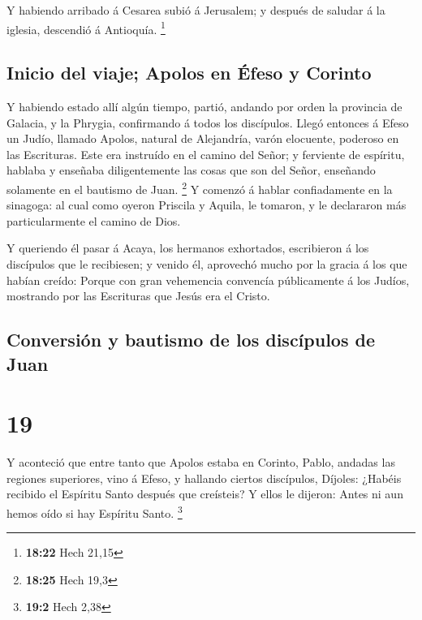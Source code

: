  Y habiendo arribado á Cesarea subió á Jerusalem; y
después de saludar á la iglesia, descendió á Antioquía. \footnote{\textbf{18:22}
  Hech 21,15}

\hypertarget{inicio-del-viaje-apolos-en-uxe9feso-y-corinto}{%
\subsection{Inicio del viaje; Apolos en Éfeso y
Corinto}\label{inicio-del-viaje-apolos-en-uxe9feso-y-corinto}}

 Y habiendo estado allí algún tiempo, partió, andando por
orden la provincia de Galacia, y la Phrygia, confirmando á todos los
discípulos.  Llegó entonces á Efeso un Judío, llamado
Apolos, natural de Alejandría, varón elocuente, poderoso en las
Escrituras.  Este era instruído en el camino del Señor; y
ferviente de espíritu, hablaba y enseñaba diligentemente las cosas que
son del Señor, enseñando solamente en el bautismo de Juan. \footnote{\textbf{18:25}
  Hech 19,3}  Y comenzó á hablar confiadamente en la
sinagoga: al cual como oyeron Priscila y Aquila, le tomaron, y le
declararon más particularmente el camino de Dios.

 Y queriendo él pasar á Acaya, los hermanos exhortados,
escribieron á los discípulos que le recibiesen; y venido él, aprovechó
mucho por la gracia á los que habían creído:  Porque con
gran vehemencia convencía públicamente á los Judíos, mostrando por las
Escrituras que Jesús era el Cristo.

\hypertarget{conversiuxf3n-y-bautismo-de-los-discuxedpulos-de-juan}{%
\subsection{Conversión y bautismo de los discípulos de
Juan}\label{conversiuxf3n-y-bautismo-de-los-discuxedpulos-de-juan}}

\hypertarget{section-18}{%
\section{19}\label{section-18}}

 Y aconteció que entre tanto que Apolos estaba en Corinto,
Pablo, andadas las regiones superiores, vino á Efeso, y hallando ciertos
discípulos,  Díjoles: ¿Habéis recibido el Espíritu Santo
después que creísteis? Y ellos le dijeron: Antes ni aun hemos oído si
hay Espíritu Santo. \footnote{\textbf{19:2} Hech 2,38}

